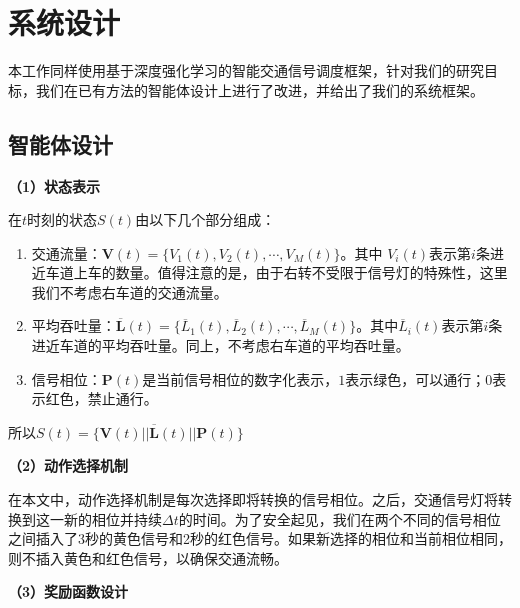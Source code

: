 \section{系统设计}
本工作同样使用基于深度强化学习的智能交通信号调度框架，针对我们的研究目标，我们在已有方法的智能体设计上进行了改进，并给出了我们的系统框架。
\subsection{智能体设计}
\textbf{（1）状态表示}

在$t$时刻的状态$S(t)$由以下几个部分组成：
\begin{enumerate}
\item 交通流量：$\boldsymbol{V}(t)=\{V_1(t),V_2(t),\cdots,V_M(t)\}$。其中 $V_i(t)$表示第$i$条进近车道上车的数量。值得注意的是，由于右转不受限于信号灯的特殊性，这里我们不考虑右车道的交通流量。
\item 平均吞吐量：$\boldsymbol{\overline{L}}(t)=\{\overline{L}_1(t),\overline{L}_2(t),\cdots,\overline{L}_M(t)\}$。其中$\overline{L}_i(t)$表示第$i$条进近车道的平均吞吐量。同上，不考虑右车道的平均吞吐量。
\item 信号相位：$\boldsymbol{P}(t)$是当前信号相位的数字化表示，$1$表示绿色，可以通行；$0$表示红色，禁止通行。
\end{enumerate}
所以$S(t)=\{\boldsymbol{V}(t) || \boldsymbol{\overline{L}}(t) || \boldsymbol{P}(t) \}$

\textbf{（2）动作选择机制}

在本文中，动作选择机制是每次选择即将转换的信号相位。之后，交通信号灯将转换到这一新的相位并持续$\Delta t$的时间。为了安全起见，我们在两个不同的信号相位之间插入了3秒的黄色信号和2秒的红色信号。如果新选择的相位和当前相位相同，则不插入黄色和红色信号，以确保交通流畅。

\textbf{（3）奖励函数设计}

